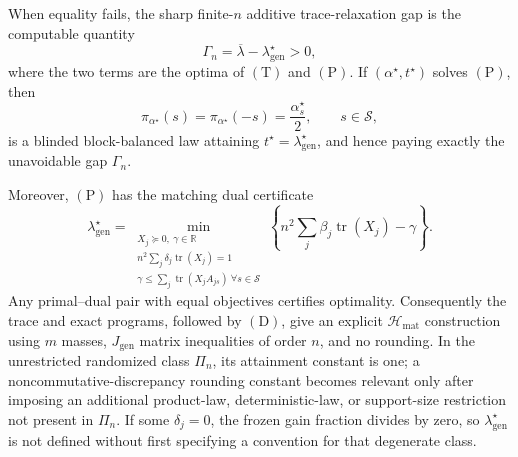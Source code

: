 When equality fails, the sharp finite-\(n\) additive trace-relaxation gap is the computable quantity
\[
\Gamma_n=\overline\lambda-\lambda_{\mathrm{gen}}^\star>0,
\tag{G}
\]
where the two terms are the optima of \((\mathrm T)\) and \((\mathrm P)\). If \((\alpha^\star,t^\star)\) solves \((\mathrm P)\), then
\[
\pi_{\alpha^\star}(s)=\pi_{\alpha^\star}(-s)=\frac{\alpha_s^\star}{2},
\qquad s\in\mathscr S,
\tag{D}
\]
is a blinded block-balanced law attaining \(t^\star=\lambda_{\mathrm{gen}}^\star\), and hence paying exactly the unavoidable gap \(\Gamma_n\).

Moreover, \((\mathrm P)\) has the matching dual certificate
\[
\lambda_{\mathrm{gen}}^\star
=\min_{\substack{X_j\succeq0,\ \gamma\in\mathbb R\\
n^2\sum_j\delta_j\operatorname{tr}(X_j)=1\\
\gamma\le\sum_j\operatorname{tr}(X_jA_{js})\ \forall s\in\mathscr S}}
\left\{
n^2\sum_j\beta_j\operatorname{tr}(X_j)-\gamma
\right\}.
\tag{C}
\]
Any primal--dual pair with equal objectives certifies optimality. Consequently the trace and exact programs, followed by \((\mathrm D)\), give an explicit \(\mathcal H_{\mathrm{mat}}\) construction using \(m\) masses, \(J_{\mathrm{gen}}\) matrix inequalities of order \(n\), and no rounding. In the unrestricted randomized class \(\Pi_n\), its attainment constant is one; a noncommutative-discrepancy rounding constant becomes relevant only after imposing an additional product-law, deterministic-law, or support-size restriction not present in \(\Pi_n\). If some \(\delta_j=0\), the frozen gain fraction divides by zero, so \(\lambda_{\mathrm{gen}}^\star\) is not defined without first specifying a convention for that degenerate class.